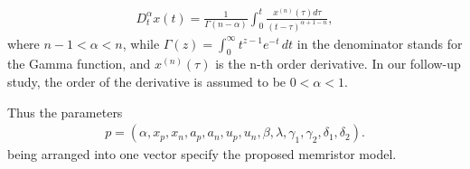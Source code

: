 \documentclass[10pt]{article}
\begin{document}
\begin{multicols}{2}
\begin{align}
    D_t^\alpha x(t) = \frac{1}{\Gamma (n-\alpha)} \int_0^t \frac{x^{(n)} (\tau)d \tau}{(t - \tau)^{\alpha+1-n}}, \label{equa:12}
\end{align}
where $n-1<\alpha<n$, while $\Gamma (z)= \int_0^\infty t^{z-1} e^{-t} \,dt$ in the denominator stands for the Gamma function, and $x^{(n)} (\tau)$ is the n-th order derivative. In our follow-up study, the order of the derivative is assumed to be $0 < \alpha < 1$. \par
Thus the parameters
\begin{align}
    p = (\alpha, x_p, x_n, a_p, a_n, u_p, u_n, \beta, \lambda, \gamma _1, \gamma _2, \delta_1, \delta_2). \label{equa:13}
\end{align}
being arranged into one vector specify the proposed memristor model.
\par
{\centering %
}
\end{multicols}
\end{document}
